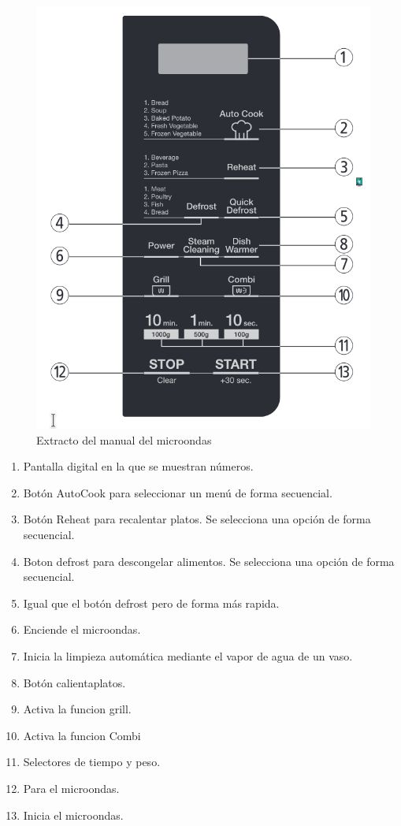\documentclass[a4paper,11pt]{article}
\begin{document}
\begin{figure}[h!]
 \centering
 \includegraphics[scale=0.6]{microondasmanual.png}
 \caption{Extracto del manual del microondas}
 \label{fig:micmanual}
\end{figure}


\begin{enumerate}
  \item Pantalla digital en la que se muestran números.
  \item Botón AutoCook para seleccionar un menú de forma secuencial.
  \item Botón Reheat para recalentar platos. Se selecciona una opción de forma secuencial.
  \item Boton defrost para descongelar alimentos. Se selecciona una opción de forma secuencial.
  \item Igual que el botón defrost pero de forma más rapida.
  \item Enciende el microondas.
  \item Inicia la limpieza automática mediante el vapor de agua de un vaso.
  \item Botón calientaplatos.
  \item Activa la funcion grill.
  \item Activa la funcion Combi
  \item Selectores de tiempo y peso.
  \item Para el microondas.
  \item Inicia el microondas.
\end{enumerate}
\end{document}
